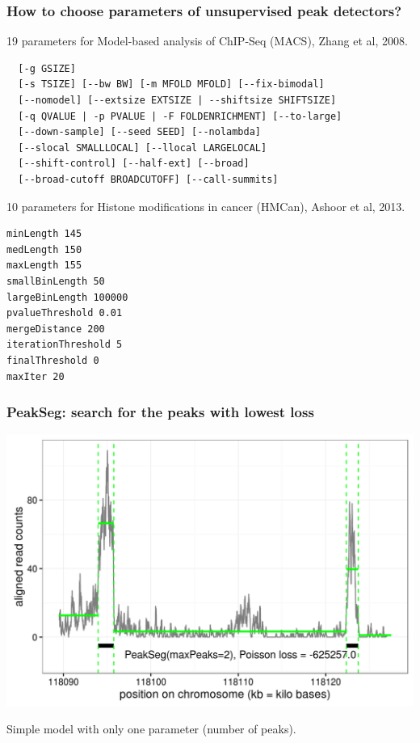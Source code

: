\documentclass{beamer}
\begin{document}
\begin{frame}[fragile]
  \frametitle{How to choose parameters of unsupervised peak
    detectors?}
\scriptsize
19 parameters for Model-based analysis of ChIP-Seq (MACS), Zhang et al, 2008.
\begin{verbatim}
  [-g GSIZE]
  [-s TSIZE] [--bw BW] [-m MFOLD MFOLD] [--fix-bimodal]
  [--nomodel] [--extsize EXTSIZE | --shiftsize SHIFTSIZE]
  [-q QVALUE | -p PVALUE | -F FOLDENRICHMENT] [--to-large]
  [--down-sample] [--seed SEED] [--nolambda]
  [--slocal SMALLLOCAL] [--llocal LARGELOCAL]
  [--shift-control] [--half-ext] [--broad]
  [--broad-cutoff BROADCUTOFF] [--call-summits]
\end{verbatim}
10 parameters for Histone modifications in cancer (HMCan),
Ashoor et al, 2013.
\begin{verbatim}
minLength 145
medLength 150
maxLength 155
smallBinLength 50
largeBinLength 100000
pvalueThreshold 0.01
mergeDistance 200
iterationThreshold 5
finalThreshold 0
maxIter 20
\end{verbatim}
\end{frame}

\begin{frame}
  \frametitle{PeakSeg: search for the peaks with lowest loss}
  \includegraphics[width=1\textwidth]{figure-macs-problem-PeakSeg.png}
  
  Simple model with only one parameter (number of peaks).
\end{frame}
\end{document}
